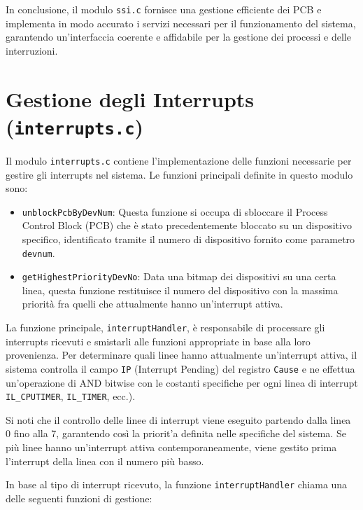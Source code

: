 \documentclass[a4paper]{article}
\begin{document}
In conclusione, il modulo \texttt{ssi.c} fornisce una gestione efficiente dei PCB e implementa in modo accurato i servizi necessari per il funzionamento del sistema, garantendo un'interfaccia coerente e affidabile per la gestione dei processi e delle interruzioni.

\section{Gestione degli Interrupts (\texttt{interrupts.c})}

Il modulo \texttt{interrupts.c} contiene l'implementazione delle funzioni necessarie per gestire gli interrupts nel sistema. Le funzioni principali definite in questo modulo sono:

\begin{itemize}
\item \texttt{unblockPcbByDevNum}: Questa funzione si occupa di sbloccare il Process Control Block (PCB) che è stato precedentemente bloccato su un dispositivo specifico, identificato tramite il numero di dispositivo fornito come parametro \texttt{devnum}.

\item \texttt{getHighestPriorityDevNo}: Data una bitmap dei dispositivi su una certa linea, questa funzione restituisce il numero del dispositivo con la massima priorità fra quelli che attualmente hanno un'interrupt attiva.

\end{itemize}

La funzione principale, \texttt{interruptHandler}, è responsabile di processare gli interrupts ricevuti e smistarli alle funzioni appropriate in base alla loro provenienza. Per determinare quali linee hanno attualmente un'interrupt attiva, il sistema controlla il campo \texttt{IP} (Interrupt Pending) del registro \texttt{Cause} e ne effettua un'operazione di AND bitwise con le costanti specifiche per ogni linea di interrupt \verb+IL_CPUTIMER+, \verb+IL_TIMER+, ecc.).

Si noti che il controllo delle linee di interrupt viene eseguito partendo dalla linea 0 fino alla 7, garantendo così la priorit'a definita nelle specifiche del sistema. Se più linee hanno un'interrupt attiva contemporaneamente, viene gestito prima l'interrupt della linea con il numero più basso.

In base al tipo di interrupt ricevuto, la funzione \texttt{interruptHandler} chiama una delle seguenti funzioni di gestione:
\end{document}
